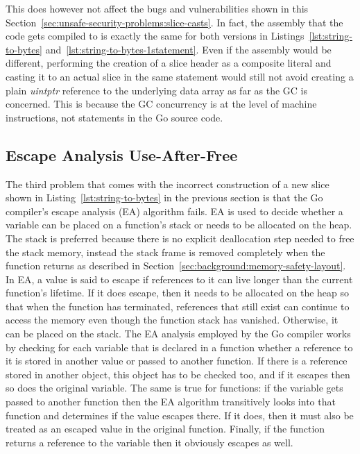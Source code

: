 

This does however not affect the bugs and vulnerabilities shown in this
Section~\ref{sec:unsafe-security-problems:slice-casts}.
In fact, the assembly that the code gets compiled to is exactly the same for both versions in
Listings~\ref{lst:string-to-bytes} and~\ref{lst:string-to-bytes-1statement}.
Even if the assembly would be different, performing the creation of a slice header as a composite literal and casting it
to an actual slice in the same statement would still not avoid creating a plain \textit{uintptr} reference to the
underlying data array as far as the \acrshort{GC} is concerned.
This is because the \acrshort{GC} concurrency is at the level of machine instructions, not statements in the Go source
code.



\subsection{Escape Analysis Use-After-Free}\label{subsec:unsafe-security-problems:slice-casts:escape-analysis}

The third problem that comes with the incorrect construction of a new slice shown in Listing~\ref{lst:string-to-bytes}
in the previous section is that the Go compiler's escape analysis (\acrshort{EA}) algorithm fails.
\acrshort{EA} is used to decide whether a variable can be placed on a function's stack or needs to be allocated on the
heap.
The stack is preferred because there is no explicit deallocation step needed to free the stack memory, instead the stack
frame is removed completely when the function returns as described in Section~\ref{sec:background:memory-safety-layout}.
In \acrshort{EA}, a value is said to escape if references to it can live longer than the current function's lifetime.
If it does escape, then it needs to be allocated on the heap so that when the function has terminated, references that
still exist can continue to access the memory even though the function stack has vanished.
Otherwise, it can be placed on the stack.
The \acrshort{EA} analysis employed by the Go compiler works by checking for each variable that is declared in a
function whether a reference to it is stored in another value or passed to another function.
If there is a reference stored in another object, this object has to be checked too, and if it escapes then so does the
original variable.
The same is true for functions: if the variable gets passed to another function then the \acrshort{EA} algorithm
transitively looks into that function and determines if the value escapes there.
If it does, then it must also be treated as an escaped value in the original function.
Finally, if the function returns a reference to the variable then it obviously escapes as well.

